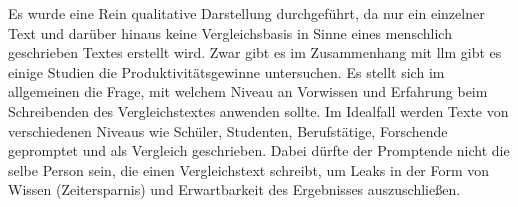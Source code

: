 
Es wurde eine Rein qualitative Darstellung durchgeführt, da nur ein einzelner Text und darüber hinaus keine Vergleichsbasis in Sinne eines menschlich geschrieben Textes erstellt wird. Zwar gibt es im Zusammenhang mit \gls{llm} gibt es einige Studien  die Produktivitätsgewinne untersuchen. Es stellt sich im allgemeinen die Frage, mit welchem Niveau an Vorwissen und Erfahrung beim Schreibenden des Vergleichstextes anwenden sollte. Im Idealfall werden Texte von verschiedenen Niveaus wie Schüler, Studenten, Berufstätige, Forschende gepromptet und als Vergleich geschrieben. Dabei dürfte der Promptende nicht die selbe Person sein, die einen Vergleichstext schreibt, um Leaks in der Form von Wissen (Zeitersparnis) und Erwartbarkeit des Ergebnisses auszuschließen.
